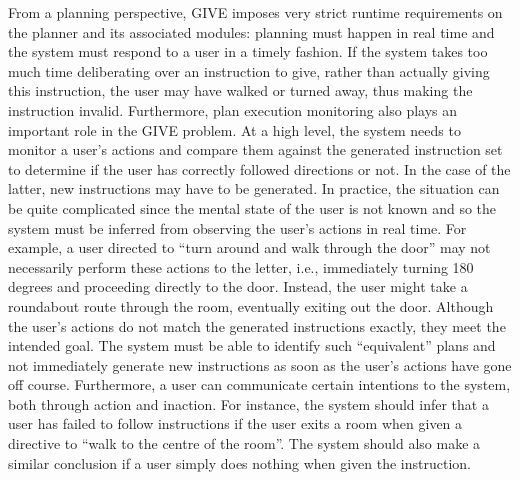 From a planning perspective, GIVE imposes very strict runtime
requirements on the planner and its associated modules: planning must
happen in real time and the system must respond to a user in a timely
fashion.  If the system takes too much time deliberating over an
instruction to give, rather than actually giving this instruction, the
user may have walked or turned away, thus making the instruction
invalid.  Furthermore, plan execution monitoring also plays an
important role in the GIVE problem.  At a high level, the system needs
to monitor a user's actions and compare them against the generated
instruction set to determine if the user has correctly followed
directions or not. In the case of the latter, new instructions may
have to be generated. In practice, the situation can be quite
complicated since the mental state of the user is not known and so the
system must be inferred from observing the user's actions in real
time. For example, a user directed to ``turn around and walk through
the door'' may not necessarily perform these actions to the letter,
i.e., immediately turning 180 degrees and proceeding directly to the
door. Instead, the user might take a roundabout route through the
room, eventually exiting out the door.  Although the user's actions do
not match the generated instructions exactly, they meet the intended
goal. The system must be able to identify such ``equivalent'' plans
and not immediately generate new instructions as soon as the user's
actions have gone off course. Furthermore, a user can communicate
certain intentions to the system, both through action and
inaction. For instance, the system should infer that a user has failed
to follow instructions if the user exits a room when given a directive
to ``walk to the centre of the room''. The system should also make a
similar conclusion if a user simply does nothing when given the
instruction.



